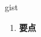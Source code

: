 
\begin{frame}
{\huge gist}
\begin{center}
\begin{enumerate}\Large
  \item \textbf{要点}
\end{enumerate}
\end{center}
\end{frame}
